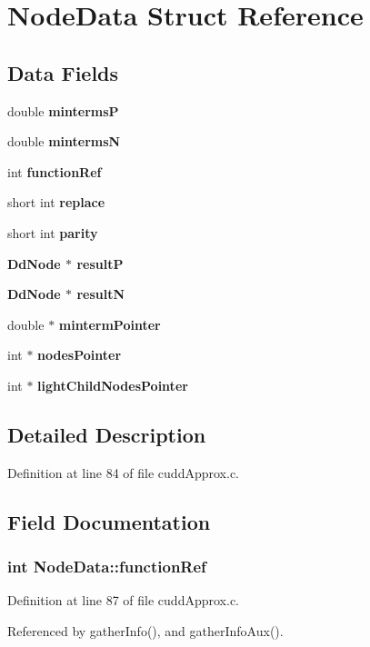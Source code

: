 \section{Node\-Data Struct Reference}
\label{structNodeData}
\subsection*{Data Fields}
\begin{CompactItemize}
\item 
double \bf{minterms\-P}
\item 
double \bf{minterms\-N}
\item 
int \bf{function\-Ref}
\item 
short int \bf{replace}
\item 
short int \bf{parity}
\item 
\bf{Dd\-Node} $\ast$ \bf{result\-P}
\item 
\bf{Dd\-Node} $\ast$ \bf{result\-N}
\item 
double $\ast$ \bf{minterm\-Pointer}
\item 
int $\ast$ \bf{nodes\-Pointer}
\item 
int $\ast$ \bf{light\-Child\-Nodes\-Pointer}
\end{CompactItemize}


\subsection{Detailed Description}




Definition at line 84 of file cudd\-Approx.c.

\subsection{Field Documentation}
\subsubsection{\setlength{\rightskip}{0pt plus 5cm}int \bf{Node\-Data::function\-Ref}}\label{structNodeData_2c61e48351849db296065241e6f98969}




Definition at line 87 of file cudd\-Approx.c.

Referenced by gather\-Info(), and gather\-Info\-Aux().
